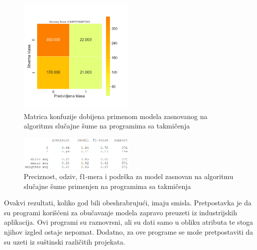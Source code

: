 \documentclass[12pt,oneside]{memoir}
\begin{document}
\begin{figure}[!ht]
  \centering
  \includegraphics[width=0.5\textwidth]{RF_c_files_confussion_matrix}
  \caption{Matrica konfuzije dobijena primenom modela zasnovanog na algoritmu slučajne šume na programima sa takmičenja}
  \label{fig:confmfinal}
\end{figure}

\begin{figure}[!ht]
  \centering
  \includegraphics[width=0.5\textwidth]{extra_final}
  \caption{Preciznost, odziv, f1-mera i podrška za model zasnovan na algoritmu slučajne šume primenjen na programima sa takmičenja}
  \label{fig:extrafinal}
\end{figure}

Ovakvi rezultati, koliko god bili obeshrabrujući, imaju smisla. Pretpostavka je da su programi korišćeni za obučavanje modela zapravo preuzeti iz industrijskih aplikacija. Ovi programi su raznovrsni, ali su dati samo u obliku atributa te stoga njihov izgled ostaje nepoznat. Dodatno, za ove programe se može pretpostaviti da su uzeti iz suštinski različitih projekata. 
\end{document}
